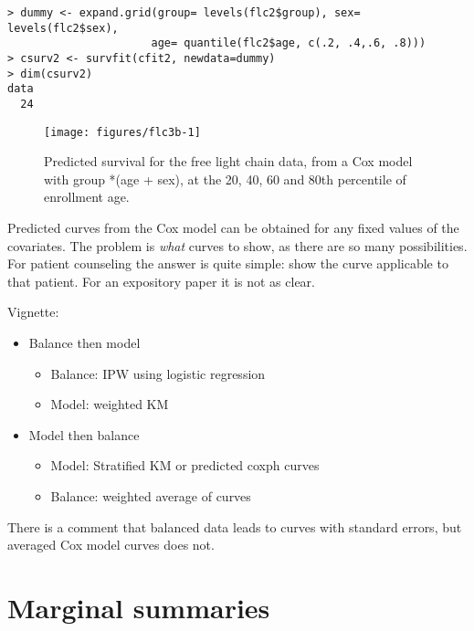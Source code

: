 \documentclass{article}\usepackage[]{graphicx}\usepackage[]{xcolor}
\makeatletter
\def\maxwidth{ %
  \ifdim\Gin@nat@width>\linewidth
    \linewidth
  \else
    \Gin@nat@width
  \fi
}
\newenvironment{kframe}{%
 \def\at@end@of@kframe{}%
 \ifinner\ifhmode%
  \def\at@end@of@kframe{\end{minipage}}%
  \begin{minipage}{\columnwidth}%
 \fi\fi%
 \def\FrameCommand##1{\hskip\@totalleftmargin \hskip-\fboxsep
 \colorbox{shadecolor}{##1}\hskip-\fboxsep
     \hskip-\linewidth \hskip-\@totalleftmargin \hskip\columnwidth}%
 \MakeFramed {\advance\hsize-\width
   \@totalleftmargin\z@ \linewidth\hsize
   \@setminipage}}%
 {\par\unskip\endMakeFramed%
 \at@end@of@kframe}
\newenvironment{knitrout}{}{} %
\makeatother
\begin{document}
\begin{knitrout}
\color{fgcolor}\begin{kframe}
\begin{verbatim}
> dummy <- expand.grid(group= levels(flc2$group), sex= levels(flc2$sex),
                      age= quantile(flc2$age, c(.2, .4,.6, .8)))
> csurv2 <- survfit(cfit2, newdata=dummy)
> dim(csurv2)
data 
  24 
\end{verbatim}
\end{kframe}
\end{knitrout}
\begin{figure}
\begin{knitrout}
\color{fgcolor}
\texttt{[image: figures/flc3b-1]} 
\end{knitrout}
 \caption{Predicted survival for the free light chain data, from a Cox model
   with group *(age + sex), at the 20, 40, 60 and 80th percentile of enrollment
   age.}
  \label{flc3}
\end{figure}

Predicted curves from the Cox model can be obtained for any fixed values of
the covariates.
The problem is \emph{what} curves to show, as there are so many possibilities.
For patient counseling the answer is quite simple: show the curve applicable to
that patient.  For an expository paper it is not as clear.

Vignette:
\begin{itemize}
  \item Balance then model
    \begin{itemize}
      \item Balance: IPW using logistic regression
      \item Model: weighted KM
    \end{itemize}
  \item Model then balance
    \begin{itemize}
      \item Model: Stratified KM or predicted coxph curves
      \item Balance: weighted average of curves
    \end{itemize}
\end{itemize}

There is a comment that balanced data leads to curves with standard errors,
but averaged Cox model curves does not.



\section{Marginal summaries}
\end{document}
